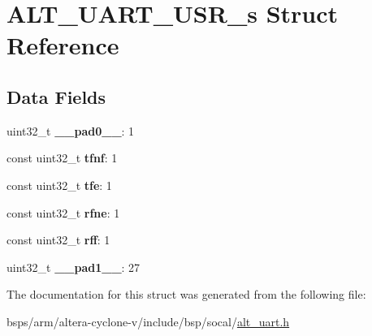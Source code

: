 \hypertarget{structALT__UART__USR__s}{}\section{A\+L\+T\+\_\+\+U\+A\+R\+T\+\_\+\+U\+S\+R\+\_\+s Struct Reference}
\label{structALT__UART__USR__s}
\subsection*{Data Fields}
\begin{DoxyCompactItemize}
\item 
\mbox{\label{structALT__UART__USR__s_adcdcaf3ff969c4475f655d7c3acc0e90}} 
uint32\+\_\+t {\bfseries \+\_\+\+\_\+pad0\+\_\+\+\_\+}\+: 1
\item 
\mbox{\label{structALT__UART__USR__s_ac47ae430e8cee07c482a0f533e26ed27}} 
const uint32\+\_\+t {\bfseries tfnf}\+: 1
\item 
\mbox{\label{structALT__UART__USR__s_a92862cdd64cfed2976e7a50e67bad1bb}} 
const uint32\+\_\+t {\bfseries tfe}\+: 1
\item 
\mbox{\label{structALT__UART__USR__s_a01284d49f9d1d5a0142c9ae2a157604f}} 
const uint32\+\_\+t {\bfseries rfne}\+: 1
\item 
\mbox{\label{structALT__UART__USR__s_a3094c88fb086b018a929fb06b38a24a1}} 
const uint32\+\_\+t {\bfseries rff}\+: 1
\item 
\mbox{\label{structALT__UART__USR__s_a8be1504dbdb6e2383dd01c9ea12067a7}} 
uint32\+\_\+t {\bfseries \+\_\+\+\_\+pad1\+\_\+\+\_\+}\+: 27
\end{DoxyCompactItemize}


The documentation for this struct was generated from the following file\+:\begin{DoxyCompactItemize}
\item 
bsps/arm/altera-\/cyclone-\/v/include/bsp/socal/\mbox{\hyperlink{alt__uart_8h}{alt\+\_\+uart.\+h}}\end{DoxyCompactItemize}
